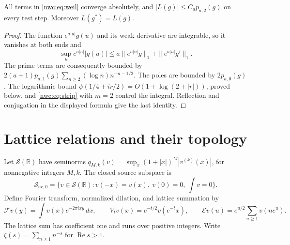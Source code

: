\begin{lemma}\label{nwc:lem:weil-continuity}
All terms in \eqref{nwc:eq:weil} converge absolutely, and
$|L(g)|\leq C_a p_{a,2}(g)$ on every test step.
Moreover $L(g^*)=\overline{L(g)}$.
\end{lemma}
\begin{proof}
The function $e^{a|u|}g(u)$ and its weak derivative are integrable,
so it vanishes at both ends and
\[
 \sup_u e^{a|u|}|g(u)|\leq
 a\|e^{a|u|}g\|_1+\|e^{a|u|}g'\|_1.
\]
The prime terms are consequently bounded by
$2(a+1)p_{a,1}(g)\sum_{n\geq2}(\log n)n^{-a-1/2}$.
The poles are bounded by $2p_{a,0}(g)$.
The logarithmic bound
$\psi(1/4+ir/2)=O(1+\log(2+|r|))$, proved below, and
\eqref{nwc:eq:strip} with $m=2$ control the integral.
Reflection and conjugation in the displayed formula give the last
identity.
\end{proof}

\section{Lattice relations and their topology}

Let $\mathcal S(\mathbb R)$ have seminorms
$q_{M,k}(v)=\sup_x(1+|x|)^M|v^{(k)}(x)|$, for nonnegative integers
$M,k$. The closed source subspace is
\[
 \mathcal S_{\mathrm{ev},0}
 =\{v\in\mathcal S(\mathbb R):v(-x)=v(x),\ v(0)=0,\ \int v=0\}.
\]
Define Fourier transform, normalized dilation, and lattice summation by
\begin{equation}\label{nwc:eq:theta}
 \mathcal Fv(y)=\int v(x)e^{-2\pi ixy}\,dx,\qquad
 V_tv(x)=e^{-t/2}v(e^{-t}x),\qquad
 \mathcal Ev(u)=e^{u/2}\sum_{n\geq1}v(ne^u).
\end{equation}
The lattice sum has coefficient one and runs over positive integers.
Write $\zeta(s)=\sum_{n\geq1}n^{-s}$ for $\operatorname{Re}s>1$.

